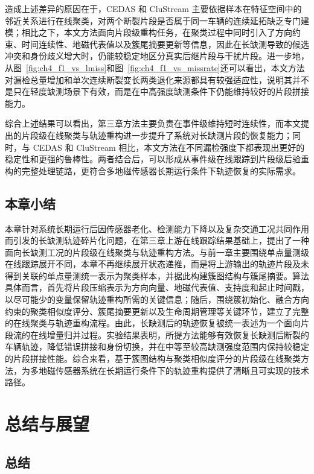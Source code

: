 \documentclass{xdupgthesis}
\providecommand{\FloatBarrier}{}
\begin{document}
造成上述差异的原因在于，CEDAS 和 CluStream 主要依据样本在特征空间中的邻近关系进行在线聚类，对两个断裂片段是否属于同一车辆的连续延拓缺乏专门建模；相比之下，本文方法面向片段级重构任务，在聚类过程中同时引入了方向约束、时间连续性、地磁代表值以及簇尾摘要更新等信息，因此在长缺测导致的候选冲突和身份歧义增大时，仍能较稳定地区分真实后继片段与干扰片段。进一步地，从图~\ref{fig:ch4_f1_vs_lmiss}和图~\ref{fig:ch4_f1_vs_missrate}还可以看出，本文方法对漏检总量增加和单次连续断裂变长两类退化来源都具有较强适应性，说明其并不是只在轻度缺测场景下有效，而是在中高强度缺测条件下仍能维持较好的片段拼接能力。


综合上述结果可以看出，第三章方法主要负责在事件级维持短时连续性，而本文提出的片段级在线聚类与轨迹重构进一步提升了系统对长缺测片段的恢复能力；同时，与 CEDAS 和 CluStream 相比，本文方法在不同漏检强度下都表现出更好的稳定性和更强的鲁棒性。两者结合后，可以形成从事件级在线跟踪到片段级后验重构的完整处理链路，更符合多地磁传感器长期运行条件下轨迹恢复的实际需求。

\FloatBarrier



\section{本章小结}

本章针对系统长期运行后因传感器老化、检测能力下降以及复杂交通工况共同作用而引发的长缺测轨迹碎片化问题，在第三章上游在线跟踪结果基础上，提出了一种面向长缺测工况的片段级在线聚类与轨迹重构方法。与前一章主要围绕单点量测级在线跟踪展开不同，本章不再继续展开状态递推，而是将上游输出的轨迹片段及未得到关联的单点量测统一表示为聚类样本，并据此构建簇图结构与簇尾摘要。算法具体而言，首先将片段压缩表示为方向向量、地磁代表值、支持度和起止时间戳，以尽可能少的变量保留轨迹重构所需的关键信息；随后，围绕簇初始化、融合方向约束的聚类相似度评分、簇尾摘要更新以及生命周期管理等关键环节，建立了完整的在线聚类与轨迹重构流程。由此，长缺测后的轨迹恢复被统一表述为一个面向片段流的在线增量归并过程。实验结果表明，所提方法能够有效恢复长缺测后断裂的车辆轨迹，降低错误拼接和身份切换，并在中等至较高缺测强度范围内保持较稳定的片段拼接性能。综合来看，基于簇图结构与聚类相似度评分的片段级在线聚类方法，为多地磁传感器系统在长期运行条件下的轨迹重构提供了清晰且可实现的技术路径。


\chapter{总结与展望}

\section{总结}
\end{document}
